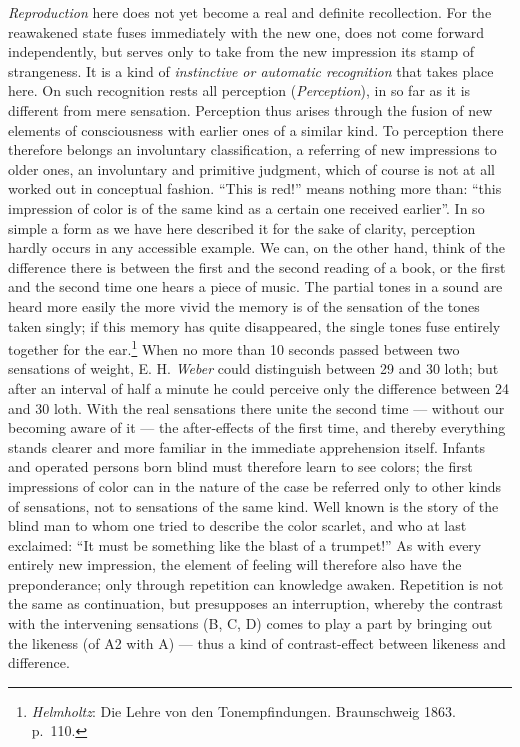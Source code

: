 \documentclass[12pt,a4paper]{book}
\newcommand{\opage}[1]{\marginnote{\footnotesize\textit{[#1]}}}
\begin{document}
\emph{Reproduction} here does not yet become a real and definite
recollection. For the reawakened state fuses immediately with the new one,
does not come forward independently, but serves only to take from the new
impression its stamp of strangeness. It is a kind of \emph{instinctive or
automatic recognition} that takes place here. On such recognition rests all
perception (\textit{Perception}), in so far as it is different from mere
sensation. Perception thus arises through the fusion of new elements of
consciousness with earlier ones of a similar kind. To perception there
therefore belongs an involuntary classification, a referring of new
impressions to older ones, an involuntary and primitive judgment, which of
course is not at all worked out in conceptual fashion. ``This is red!''
means nothing more than: ``this impression of color is of the same kind as
a certain one received earlier''. In so simple a form as we have here
described it for the sake of clarity, perception hardly occurs in any
accessible example. We can, on the other hand, think of the difference
there is between the first and the second reading of a book, or the first
and the second time one hears a piece of music. The partial tones in a
sound are heard more easily the more vivid the memory is of the sensation
of the tones taken singly; if this memory has quite disappeared, the
single tones fuse entirely together for the
ear.\footnote{\emph{Helmholtz}: Die Lehre von den Tonempfindungen.
Braunschweig 1863. p.~110.} When no more than 10 seconds passed between two
sensations of weight, E. H. \emph{Weber} could
\opage{152}distinguish between 29 and 30 loth; but after an interval of
half a minute he could perceive only the difference between 24 and 30
loth. With the real sensations there unite the second time --- without our
becoming aware of it --- the after-effects of the first time, and thereby
everything stands clearer and more familiar in the immediate apprehension
itself. Infants and operated persons born blind must therefore learn to
see colors; the first impressions of color can in the nature of the case
be referred only to other kinds of sensations, not to sensations of the
same kind. Well known is the story of the blind man to whom one tried to
describe the color scarlet, and who at last exclaimed: ``It must be
something like the blast of a trumpet!'' As with every entirely new
impression, the element of feeling will therefore also have the
preponderance; only through repetition can knowledge awaken. Repetition is
not the same as continuation, but presupposes an interruption, whereby the
contrast with the intervening sensations (B, C, D) comes to play a part by
bringing out the likeness (of A2 with A) --- thus a kind of contrast-effect
between likeness and difference.
\end{document}
